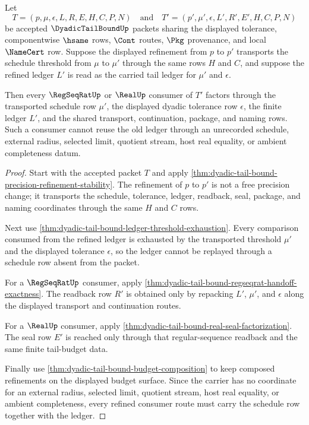 \begin{theorem}
\label{thm:dyadic-tail-bound-schedule-monotone-consumer}
Let
$$
T=(p,\mu,\epsilon,L,R,E,H,C,P,N)
\quad\text{and}\quad
T'=(p',\mu',\epsilon,L',R',E',H,C,P,N)
$$
be accepted $\DyadicTailBoundUp$ packets sharing the displayed tolerance, componentwise $\hsame$ rows, $\Cont$ routes, $\Pkg$ provenance, and local $\NameCert$ row. Suppose the displayed refinement from $p$ to $p'$ transports the schedule threshold from $\mu$ to $\mu'$ through the same rows $H$ and $C$, and suppose the refined ledger $L'$ is read as the carried tail ledger for $\mu'$ and $\epsilon$.

Then every $\RegSeqRatUp$ or $\RealUp$ consumer of $T'$ factors through the transported schedule row $\mu'$, the displayed dyadic tolerance row $\epsilon$, the finite ledger $L'$, and the shared transport, continuation, package, and naming rows. Such a consumer cannot reuse the old ledger through an unrecorded schedule, external radius, selected limit, quotient stream, host real equality, or ambient completeness datum.
\end{theorem}
\begin{proof}
Start with the accepted packet $T$ and apply \autoref{thm:dyadic-tail-bound-precision-refinement-stability}. The refinement of $p$ to $p'$ is not a free precision change; it transports the schedule, tolerance, ledger, readback, seal, package, and naming coordinates through the same $H$ and $C$ rows.

Next use \autoref{thm:dyadic-tail-bound-ledger-threshold-exhaustion}. Every comparison consumed from the refined ledger is exhausted by the transported threshold $\mu'$ and the displayed tolerance $\epsilon$, so the ledger cannot be replayed through a schedule row absent from the packet.

For a $\RegSeqRatUp$ consumer, apply \autoref{thm:dyadic-tail-bound-regseqrat-handoff-exactness}. The readback row $R'$ is obtained only by repacking $L'$, $\mu'$, and $\epsilon$ along the displayed transport and continuation routes.

For a $\RealUp$ consumer, apply \autoref{thm:dyadic-tail-bound-real-seal-factorization}. The seal row $E'$ is reached only through that regular-sequence readback and the same finite tail-budget data.

Finally use \autoref{thm:dyadic-tail-bound-budget-composition} to keep composed refinements on the displayed budget surface. Since the carrier has no coordinate for an external radius, selected limit, quotient stream, host real equality, or ambient completeness, every refined consumer route must carry the schedule row together with the ledger.
\end{proof}

